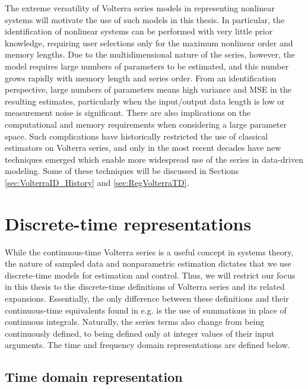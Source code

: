 The extreme versatility of Volterra series models in representing nonlinear systems will motivate the use of such models in this thesis. In particular, the identification of nonlinear systems can be performed with very little prior knowledge, requiring user selections only for the maximum nonlinear order and memory lengths. Due to the multidimensional nature of the series, however, the model requires large numbers of parameters to be estimated, and this number grows rapidly with memory length and series order. From an identification perspective, large numbers of parameters means high variance and MSE in the resulting estimates, particularly when the input/output data length is low or measurement noise is significant. There are also implications on the computational and memory requirements when considering a large parameter space. Such complications have historically restricted the use of classical estimators on Volterra series, and only in the most recent decades have new techniques emerged which enable more widespread use of the series in data-driven modeling. Some of these techniques will be discussed in Sections \ref{sec:VolterraID_History} and \ref{sec:RegVolterraTD}. 

\section{Discrete-time representations}
\label{sec:DTrepresentations_Volterra}

While the continuous-time Volterra series is a useful concept in systems theory, the nature of sampled data and nonparametric estimation dictates that we use discrete-time models for estimation and control. Thus, we will restrict our focus in this thesis to the discrete-time definitions of Volterra series and its related expansions. Essentially, the only difference between these definitions and their continuous-time equivalents found in e.g. \cite{Schetzen1980} is the use of summations in place of continuous integrals. Naturally, the series terms also change from being continuously defined, to being defined only at integer values of their input arguments. The time and frequency domain representations are defined below.

\subsection{Time domain representation}

